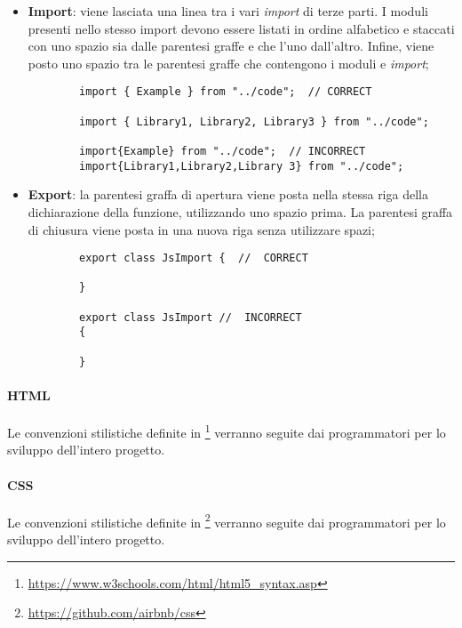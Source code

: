 \begin{itemize}
	\item{\textbf{Import}: viene lasciata una linea tra i vari \emph{import} di terze parti. I moduli presenti nello stesso import devono essere listati in ordine alfabetico e staccati con uno spazio sia dalle parentesi graffe e che l'uno dall'altro. Infine, viene posto uno spazio tra le parentesi graffe che contengono i moduli e \emph{import}; }
	\begin{lstlisting}
		import { Example } from "../code";  // CORRECT
		
		import { Library1, Library2, Library3 } from "../code";
		
		import{Example} from "../code";  // INCORRECT
		import{Library1,Library2,Library 3} from "../code";
	\end{lstlisting}
	
	\item{\textbf{Export}: la parentesi graffa di apertura viene posta nella stessa riga della dichiarazione della funzione, utilizzando uno spazio prima. La parentesi graffa di chiusura viene posta in una nuova riga senza utilizzare spazi;}	
	\begin{lstlisting}
		export class JsImport {  //  CORRECT
		
		}
		
		export class JsImport //  INCORRECT
		{  
		
		}
	\end{lstlisting}
\end{itemize}

\paragraph{HTML}\Spazio

Le convenzioni stilistiche definite in \footnote{\url{https://www.w3schools.com/html/html5_syntax.asp}} verranno seguite dai programmatori per lo sviluppo dell'intero progetto.

\paragraph{CSS}\Spazio
Le convenzioni stilistiche definite in \footnote{\url{https://github.com/airbnb/css}} verranno seguite dai programmatori per lo sviluppo dell'intero progetto.

\pagebreak
